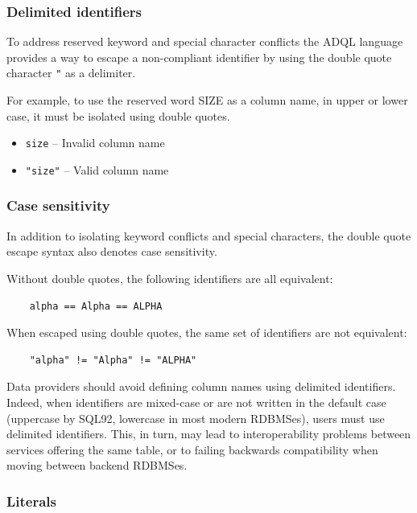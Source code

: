 \documentclass[11pt,a4paper]{ivoa}
\begin{document}
\subsubsection{Delimited identifiers}
\label{sec:adql.escape}

To address reserved keyword and special character conflicts the ADQL language
provides a way to escape a non-compliant identifier by using the double
quote character \verb:": as a delimiter.

For example, to use the reserved word SIZE as a column name, in upper or lower case,
it must be isolated using double quotes.

\begin{itemize}
    \item \verb:size: -- Invalid column name
    \item \verb:"size": -- Valid column name
\end{itemize}

\subsubsection{Case sensitivity}
\label{sec:adql.case}

In addition to isolating keyword conflicts and special characters,
the double quote escape syntax also denotes case sensitivity.

Without double quotes, the following identifiers are all equivalent:
\begin{verbatim}
    alpha == Alpha == ALPHA
\end{verbatim}

When escaped using double quotes, the same set of identifiers are not equivalent:
\begin{verbatim}
    "alpha" != "Alpha" != "ALPHA"
\end{verbatim}

Data providers should avoid defining column names using delimited identifiers.
Indeed, when identifiers are mixed-case or are not written in the default case
(uppercase by SQL92, lowercase in most modern RDBMSes), users must use delimited
identifiers. This, in turn, may lead to interoperability problems between
services offering the same table, or to failing backwards compatibility when
moving between backend RDBMSes.

\subsubsection{Literals}
\label{sec:literals}
\end{document}

